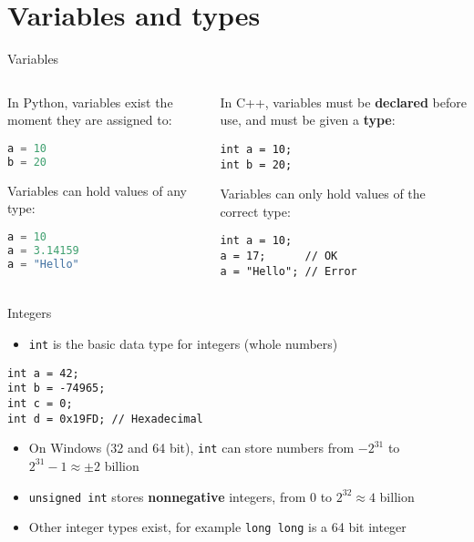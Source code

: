\part{Variables and types}
\frame{\partpage}

\begin{frame}[fragile]{Variables}
	\begin{columns}[onlytextwidth]
		\begin{column}{0.45\textwidth}
			In Python, variables exist the moment they are assigned to:
			\begin{lstlisting}[language=Python]
a = 10
b = 20
			\end{lstlisting}
			\pause
			Variables can hold values of any type:
			\begin{lstlisting}[language=Python]
a = 10
a = 3.14159
a = "Hello"
			\end{lstlisting}
		\end{column}
		\pause
		\begin{column}{0.45\textwidth}
			In C++, variables must be \textbf{declared} before use, and must be given a \textbf{type}:
			\begin{lstlisting}
int a = 10;
int b = 20;
			\end{lstlisting}
			\pause
			Variables can only hold values of the correct type:
			\begin{lstlisting}
int a = 10;
a = 17;      // OK
a = "Hello"; // Error
			\end{lstlisting}
		\end{column}
	\end{columns}
\end{frame}

\begin{frame}[fragile]{Integers}
	\begin{itemize}
		\item \lstinline{int} is the basic data type for integers (whole numbers)
	\end{itemize}
	\begin{lstlisting}
int a = 42;
int b = -74965;
int c = 0;
int d = 0x19FD; // Hexadecimal
	\end{lstlisting}
	\pause
	\begin{itemize}
		\item On Windows (32 and 64 bit), \lstinline{int} can store numbers from $-2^{31}$ to $2^{31}-1 \approx \pm 2$ billion \pause
		\item \lstinline{unsigned int} stores \textbf{nonnegative} integers, from 0 to $2^{32} \approx 4$ billion \pause
		\item Other integer types exist, for example \lstinline{long long} is a 64 bit integer
	\end{itemize}
\end{frame}


